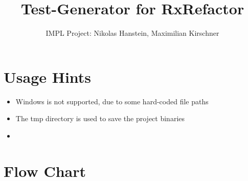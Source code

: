 \documentclass[accentcolor=tud9c, colorback]{tudreport}
\title{Test-Generator for RxRefactor}
\subtitle{IMPL Project: Nikolas Hanstein, Maximilian Kirschner}
\begin{document}
	\maketitle
	
	\tableofcontents
	
	\chapter{Usage Hints}
		\begin{itemize}
			\item Windows is not supported, due to some hard-coded file paths
			\item The tmp directory is used to save the project binaries
			\item 
		\end{itemize}
	\chapter{Flow Chart}
\end{document}
